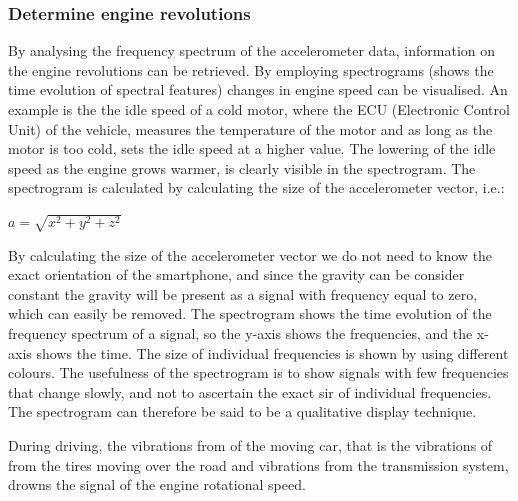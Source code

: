 \subsubsection{Determine engine revolutions}
By analysing the frequency spectrum of the accelerometer data, information on the engine revolutions can be retrieved. By employing spectrograms (shows the time evolution of spectral features)  changes in engine speed can be visualised. An example is the the idle speed of a cold motor, where the ECU (Electronic Control Unit) of the vehicle, measures the temperature of the motor and as long as the motor is too cold, sets the idle speed at a higher value. The lowering of the idle speed as the engine grows warmer, is clearly visible in the spectrogram.
The spectrogram is calculated by calculating the size of the accelerometer vector, i.e.:

\begin{center}
$a = \sqrt{x^2+y^2+z^2}$
\end{center}

By calculating the size of the accelerometer vector we do not need to know the exact orientation of the smartphone, and since the gravity can be consider constant the gravity will be present as a signal with frequency equal to zero, which can easily be removed.
The spectrogram shows the time evolution of the frequency spectrum of a signal, so the y-axis shows the frequencies, and the x-axis shows the time. The size of individual frequencies is shown by using different colours. The usefulness of the spectrogram is to show signals with few  frequencies that change slowly, and not to ascertain the exact sir of individual frequencies. The spectrogram can therefore be said to be a qualitative display technique.

During driving, the vibrations from of the moving car, that is the vibrations of from the tires moving over the road and vibrations from the transmission system, drowns the signal of the engine rotational speed.


